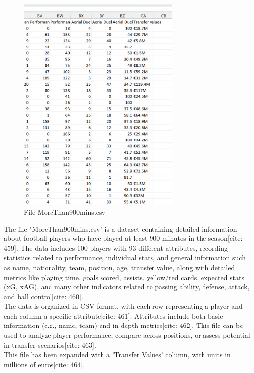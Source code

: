\documentclass[12pt]{report}
\begin{document}
{{{\begin{figure}[h]
    \includegraphics[width=300px]{P41_RES.png}
    \caption{File MoreThan900mins.csv}
    \label{fig:res2}
\end{figure}
The file "MoreThan900mins.csv" is a dataset containing detailed information about football players who have played at least 900 minutes in the season[cite: 459]. The data includes 100 players with 93 different attributes, recording statistics related to performance, individual stats, and general information such as name, nationality, team, position, age, transfer value, along with detailed metrics like playing time, goals scored, assists, yellow/red cards, expected stats (xG, xAG), and many other indicators related to passing ability, defense, attack, and ball control[cite: 460]. \\
The data is organized in CSV format, with each row representing a player and each column a specific attribute[cite: 461]. Attributes include both basic information (e.g., name, team) and in-depth metrics[cite: 462]. This file can be used to analyze player performance, compare across positions, or assess potential in transfer scenarios[cite: 463]. \\
This file has been expanded with a 'Transfer Values' column, with units in millions of euros[cite: 464].
\clearpage
}}}
\end{document}
